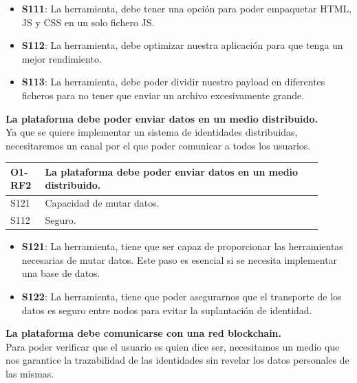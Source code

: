 \begin{itemize}
    \item \textbf{S111}: La herramienta, debe tener una opción para poder empaquetar HTML, JS y CSS en un solo fichero JS.
    \item \textbf{S112}: La herramienta, debe optimizar nuestra aplicación para que tenga un mejor rendimiento.
    \item \textbf{S113}: La herramienta, debe poder dividir nuestro payload en diferentes ficheros para no tener que enviar un archivo excesivamente grande.
\end{itemize}
\textbf{La plataforma debe poder enviar datos en un medio distribuido.}\\
Ya que se quiere implementar un sistema de identidades distribuidas, necesitaremos un canal por el que poder comunicar a todos los usuarios.
\begin{center}
    \begin{table}[h!]
        \begin{tabular}{|p{0.1\linewidth} | p{0.8\linewidth}|}
            \hline
            \rowcolor{Gray} 
            \textbf{O1-RF2} & \textbf{La plataforma debe poder enviar datos en un medio distribuido.} \\
            \hline
            S121            & Capacidad de mutar datos. \\
            \hline
            S112            & Seguro. \\
            \hline
        \end{tabular}
    \end{table}
\end{center}
\begin{itemize}
    \item \textbf{S121}: La herramienta, tiene que ser capaz de proporcionar las herramientas necesarias de mutar datos. Este paso es esencial si se necesita implementar una base de datos.
    \item \textbf{S122}: La herramienta, tiene que poder asegurarnos que el transporte de los datos es seguro entre nodos para evitar la suplantación de identidad.
\end{itemize}
\textbf{La plataforma debe comunicarse con una red blockchain.}\\
Para poder verificar que el usuario es quien dice ser, necesitamos un medio que nos garantice la trazabilidad de las identidades sin revelar los datos personales de las mismas.
